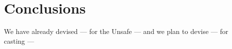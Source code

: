 
\chapter{Conclusions  }

We have already devised --- for the \java{} Unsafe \api{} --- and
we plan to devise --- for casting ---